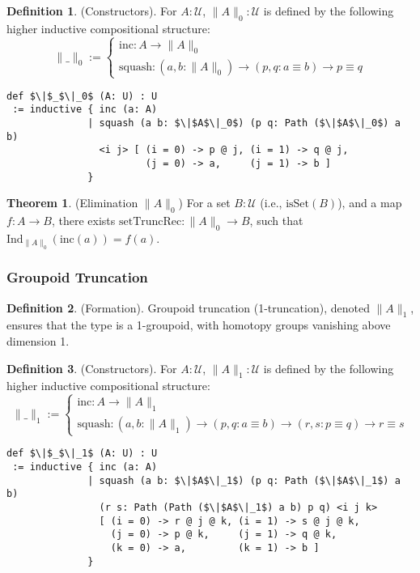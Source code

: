 \documentclass{article}
\theoremstyle{definition}
\newtheorem{theorem}{Theorem}
\newtheorem{definition}{Definition}
\begin{document}
\begin{definition} (Constructors).
For \( A : \mathcal{U} \), \( \| A \|_0 : \mathcal{U} \) is defined by the following higher
inductive compositional structure:
\[
\| \_ \|_0 :=
\begin{cases}
\text{inc} : A \to \| A \|_0 \\
\text{squash} : (a, b : \| A \|_0) \to (p, q : a \equiv b) \to p \equiv q
\end{cases}
\]
\begin{lstlisting}[mathescape=true]
def $\|$_$\|_0$ (A: U) : U
 := inductive { inc (a: A)
              | squash (a b: $\|$A$\|_0$) (p q: Path ($\|$A$\|_0$) a b)
                <i j> [ (i = 0) -> p @ j, (i = 1) -> q @ j,
                        (j = 0) -> a,     (j = 1) -> b ]
              }
\end{lstlisting}
\end{definition}

\begin{theorem} (Elimination \( \| A \|_0 \))
For a set \( B : \mathcal{U} \) (i.e., \( \text{isSet}(B) \)), and a map \( f : A \to B \),
there exists \( \text{setTruncRec} : \| A \|_0 \to B \), such that \( \text{Ind}_{\|A\|_0}(\text{inc}(a)) = f(a) \).
\end{theorem}

\subsubsection*{Groupoid Truncation}
\begin{definition} (Formation).
Groupoid truncation (1-truncation), denoted \( \| A \|_1 \), ensures that
the type is a 1-groupoid, with homotopy groups vanishing above dimension 1.
\end{definition}

\begin{definition} (Constructors).
For \( A : \mathcal{U} \), \( \| A \|_1 : \mathcal{U} \) is defined by the following higher
inductive compositional structure:
\[
\| \_ \|_1 :=
\begin{cases}
\text{inc} : A \to \| A \|_1 \\
\text{squash} : (a, b : \| A \|_1) \to (p, q : a \equiv b) \to (r, s : p \equiv q) \to r \equiv s
\end{cases}
\]
\begin{lstlisting}[mathescape=true]
def $\|$_$\|_1$ (A: U) : U
 := inductive { inc (a: A)
              | squash (a b: $\|$A$\|_1$) (p q: Path ($\|$A$\|_1$) a b)
                (r s: Path (Path ($\|$A$\|_1$) a b) p q) <i j k>
                [ (i = 0) -> r @ j @ k, (i = 1) -> s @ j @ k,
                  (j = 0) -> p @ k,     (j = 1) -> q @ k,
                  (k = 0) -> a,         (k = 1) -> b ]
              }
\end{lstlisting}
\end{definition}
\end{document}
